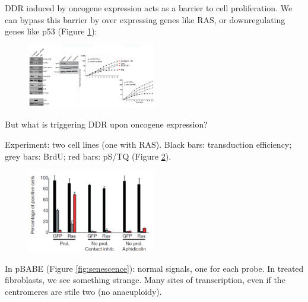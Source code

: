 
DDR induced by oncogene expression acts as a barrier to cell proliferation.
We can bypass this barrier by over expressing genes like RAS, or
downregulating genes like p53 (Figure \ref{fig:senescence2}):

\begin{figure}[h!]
\centering
\includegraphics[width=0.5\textwidth]{../_resources/b0a12e30eb68712a5f227c5bff2c9424.png} 
\label{fig:senescence2}
\end{figure}

But what is triggering DDR upon oncogene expression?

Experiment: two cell lines (one with RAS). Black bars: transduction
efficiency; grey bars: BrdU; red bars: pS/TQ (Figure \ref{fig:gfp}).

\begin{figure}[h!]
\centering
\includegraphics[width=0.5\textwidth]{../_resources/f78ec4683d1e9e77bb74c4f6a372ac8b.png}  
\label{fig:gfp}
\end{figure}

In pBABE (Figure \ref{fig:senescence}): normal signals, one for each probe. In treated fibroblasts, we
see something strange. Many sites of transcription, even if the
centromeres are stile two (no anaeuploidy).

